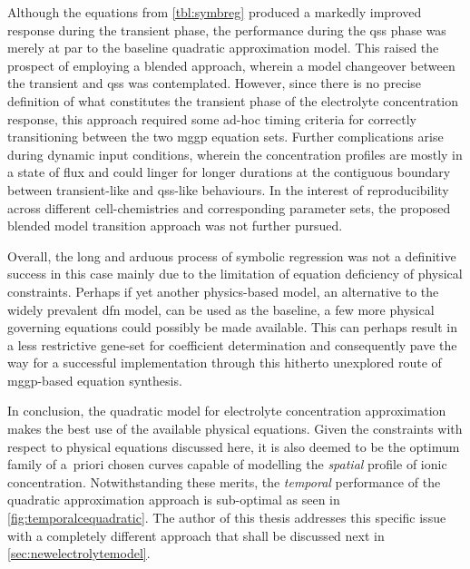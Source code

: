Although  the equations  from \cref{tbl:symbreg}  produced  a markedly  improved
response during the transient phase,  the performance during the \gls{qss} phase
was merely at par to the baseline quadratic approximation model. This raised the
prospect of  employing a  blended approach, wherein  a model  changeover between
the  transient  and \gls{qss}  was  contemplated.  However,  since there  is  no
precise definition  of what constitutes  the transient phase of  the electrolyte
concentration response, this  approach required some ad-hoc  timing criteria for
correctly  transitioning  between  the  two \gls{mggp}  equation  sets.  Further
complications arise  during dynamic input conditions,  wherein the concentration
profiles are mostly in a state of  flux and could linger for longer durations at
the contiguous  boundary between  transient-like and  \gls{qss}-like behaviours.
In  the  interest  of  reproducibility  across  different  cell-chemistries  and
corresponding parameter sets, the proposed blended model transition approach was
not further pursued.

Overall,  the  long  and  arduous  process of  symbolic  regression  was  not  a
definitive  success in  this  case  mainly due  to  the  limitation of  equation
deficiency of physical constraints. Perhaps  if yet another physics-based model,
\ie{} an  alternative to the  widely prevalent \gls{dfn}  model, can be  used as
the  baseline,  a  few  more  physical governing  equations  could  possibly  be
made  available. This  can perhaps  result in  a less  restrictive gene-set  for
coefficient  determination  and  consequently  pave the  way  for  a  successful
implementation  through  this  hitherto  unexplored  route  of  \gls{mggp}-based
equation synthesis.

In conclusion,  the quadratic model for  electrolyte concentration approximation
makes the  best use of the  available physical equations. Given  the constraints
with  respect to  physical equations  discussed here,  it is  also deemed  to be
the  optimum  family  of  a~priori  chosen  curves  capable  of  modelling  the
\emph{spatial}  profile of  ionic concentration.  Notwithstanding these  merits,
the  \emph{temporal}  performance of  the  quadratic  approximation approach  is
sub-optimal as seen in \cref{fig:temporalcequadratic}. The author of this thesis
addresses this specific issue with a completely different approach that shall be
discussed next in \cref{sec:newelectrolytemodel}.

